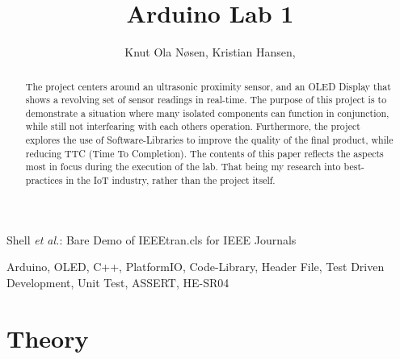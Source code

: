 \documentclass[journal]{IEEEtran}
\begin{document}
\title{Arduino Lab 1}

\author{Knut Ola Nøsen,
    Kristian Hansen,
}%

{Shell \MakeLowercase{\textit{et al.}}: Bare Demo of IEEEtran.cls for IEEE Journals}

\maketitle

\begin{abstract}
    The project centers around an ultrasonic proximity sensor, and an OLED Display that shows a revolving set of sensor readings in real-time.
    The purpose of this project is to demonstrate a situation where many isolated components can function in conjunction, while still not interfearing with each others operation.
    Furthermore, the project explores the use of Software-Libraries to improve the quality of the final product, while reducing TTC (Time To Completion).
    The contents of this paper reflects the aspects most in focus during the execution of the lab. That being my research into best-practices
    in the IoT industry, rather than the project itself.
\end{abstract}

\begin{IEEEkeywords}
    Arduino, OLED, C++, PlatformIO, Code-Library, Header File, Test Driven Development, Unit Test, ASSERT, HE-SR04
\end{IEEEkeywords}

\section{Theory}
\end{document}
